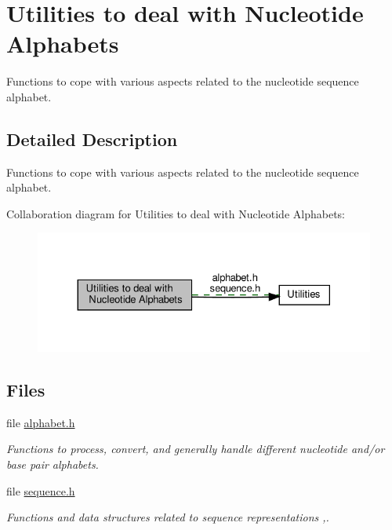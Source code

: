 \hypertarget{group__alphabet__utils}{}\section{Utilities to deal with Nucleotide Alphabets}
\label{group__alphabet__utils}


Functions to cope with various aspects related to the nucleotide sequence alphabet.  




\subsection{Detailed Description}
Functions to cope with various aspects related to the nucleotide sequence alphabet. 

Collaboration diagram for Utilities to deal with Nucleotide Alphabets\+:
\nopagebreak
\begin{figure}[H]
\begin{center}
\leavevmode
\includegraphics[width=330pt]{group__alphabet__utils}
\end{center}
\end{figure}
\subsection*{Files}
\begin{DoxyCompactItemize}
\item 
file \hyperlink{alphabet_8h}{alphabet.\+h}
\begin{DoxyCompactList}\small\item\em Functions to process, convert, and generally handle different nucleotide and/or base pair alphabets. \end{DoxyCompactList}\item 
file \hyperlink{sequence_8h}{sequence.\+h}
\begin{DoxyCompactList}\small\item\em Functions and data structures related to sequence representations ,. \end{DoxyCompactList}\end{DoxyCompactItemize}
